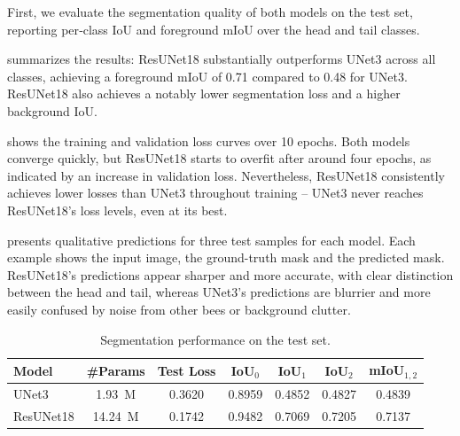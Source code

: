 First, we evaluate the segmentation quality of both models on the test set, reporting per‑class IoU and foreground mIoU over the head and tail classes.

 summarizes the results: ResUNet18 substantially outperforms UNet3 across all classes, achieving a foreground mIoU of \qty{0.71}{} compared to \qty{0.48}{} for UNet3.
ResUNet18 also achieves a notably lower segmentation loss and a higher background IoU.

 shows the training and validation loss curves over 10 epochs.
Both models converge quickly, but ResUNet18 starts to overfit after around four epochs, as indicated by an increase in validation loss.
Nevertheless, ResUNet18 consistently achieves lower losses than UNet3 throughout training -- UNet3 never reaches ResUNet18's loss levels, even at its best.

 presents qualitative predictions for three test samples for each model.
Each example shows the input image, the ground-truth mask and the predicted mask.
ResUNet18's predictions appear sharper and more accurate, with clear distinction between the head and tail, whereas UNet3's predictions are blurrier and more easily confused by noise from other bees or background clutter.

\begin{table}[htbp]
    \centering
    \caption{Segmentation performance on the test set.}
    \label{tab:segmentation_results}
    \begin{tabular}{lcccccc}
        \toprule
        \textbf{Model} & \textbf{\#Params} & \textbf{Test Loss} & \textbf{IoU$_{0}$} & \textbf{IoU$_{1}$} & \textbf{IoU$_{2}$} & \textbf{mIoU$_{1,2}$} \\
        \midrule
        UNet3          & \qty{1.93}{M}     & \qty{0.3620}{}     & \qty{0.8959}{}     & \qty{0.4852}{}     & \qty{0.4827}{}     & \qty{0.4839}{}        \\
        ResUNet18      & \qty{14.24}{M}    & \qty{0.1742}{}     & \qty{0.9482}{}     & \qty{0.7069}{}     & \qty{0.7205}{}    & \qty{0.7137}{}       \\
        \bottomrule
    \end{tabular}
\end{table}

